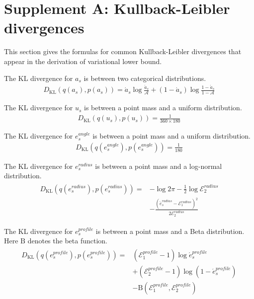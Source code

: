 \section*{Supplement A: Kullback-Leibler divergences}
\label{vi_details}
This section gives the formulas for common Kullback-Leibler divergences that appear in the derivation of variational lower bound.

The KL divergence for $a_s$ is between two categorical distributions.
\begin{align}
D_{\mathrm{KL}}(q(a_s), p(a_s))
=\acute a_s\log\frac{\acute a_s}{\mathcal A}+\left(1-\acute a_s\right)\log\frac{1-\acute a_s}{1-\mathcal A}
\end{align}

The KL divergence for $u_s$ is between a point mass and a uniform distribution.
\begin{align}
D_{\mathrm{KL}}(q(u_s), p(u_s)) = \frac{1}{360 \times 180}
\end{align}

The KL divergence for $e_s^{angle}$ is between a point mass and a uniform distribution.
\begin{align}
D_{\mathrm{KL}}(q(e_s^{angle}), p(e_s^{angle})) = \frac{1}{180}
\end{align}

The KL divergence for $e_s^{radius}$ is between a point mass and a log-normal distribution.
\begin{align}
\begin{split}
D_{\mathrm{KL}}(q(e_s^{radius}), p(e_s^{radius}))=
&-\log 2\pi - \frac{1}{2}\log \mathcal E_2^{radius}\\
&- \frac{(\acute e_s^{radius} - \mathcal E_1^{radius})^2}{2\mathcal E_2^{radius}}
\end{split}
\end{align}

The KL divergence for $e_s^{profile}$ is between a point mass and a Beta distribution. Here $\mathrm B$ denotes the beta function.
\begin{align}
\begin{split}
D_{\mathrm{KL}}(q(e_s^{profile}), p(e_s^{profile}))
= &(\mathcal E_1^{profile} - 1)\log \acute e_s^{profile}\\
   &+ (\mathcal E_2^{profile} - 1) \log (1 - \acute e_s^{profile})\\
   &- \mathrm{B}(\mathcal E_1^{profile}, \mathcal E_2^{profile})
\end{split}
\end{align}


